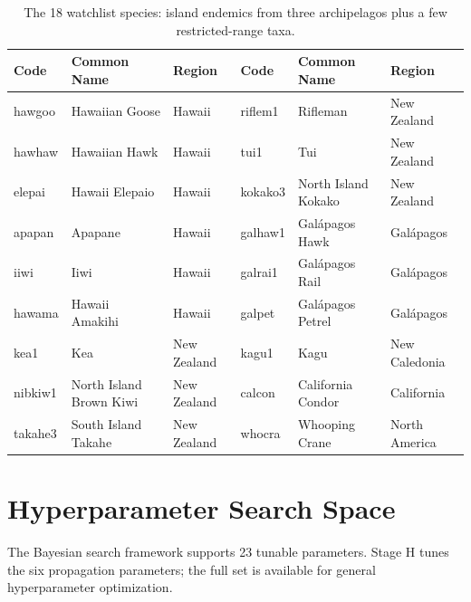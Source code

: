 \begin{table}[H]
\centering
\caption{The 18 watchlist species: island endemics from three archipelagos plus a few restricted-range taxa.}
\label{tab:watchlist}
\small
\begin{tabular}{lll@{\qquad}lll}
\toprule
Code & Common Name & Region & Code & Common Name & Region \\
\midrule
hawgoo & Hawaiian Goose & Hawaii & riflem1 & Rifleman & New Zealand \\
hawhaw & Hawaiian Hawk & Hawaii & tui1 & Tui & New Zealand \\
elepai & Hawaii Elepaio & Hawaii & kokako3 & North Island Kokako & New Zealand \\
apapan & Apapane & Hawaii & galhaw1 & Galápagos Hawk & Galápagos \\
iiwi & Iiwi & Hawaii & galrai1 & Galápagos Rail & Galápagos \\
hawama & Hawaii Amakihi & Hawaii & galpet & Galápagos Petrel & Galápagos \\
kea1 & Kea & New Zealand & kagu1 & Kagu & New Caledonia \\
nibkiw1 & North Island Brown Kiwi & New Zealand & calcon & California Condor & California \\
takahe3 & South Island Takahe & New Zealand & whocra & Whooping Crane & North America \\
\bottomrule
\end{tabular}
\end{table}


\section{Hyperparameter Search Space}
\label{sec:D-hyperparameter-search-space}

The Bayesian search framework supports 23 tunable parameters. Stage H tunes the six propagation parameters; the full set is available for general hyperparameter optimization.

